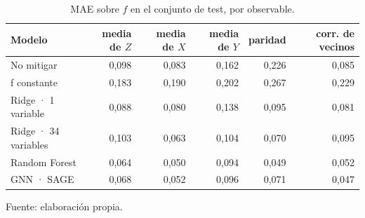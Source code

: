 \begin{table}[htbp]
    \centering
    {\footnotesize
    \begin{tabular}{@{}lrrrrr@{}}
        \toprule
        \textbf{Modelo} & \textbf{media de $Z$} & \textbf{media de $X$} & \textbf{media de $Y$} & \textbf{paridad} & \textbf{corr. de vecinos} \\
        \midrule
        No mitigar & 0,098 & 0,083 & 0,162 & 0,226 & 0,085 \\
        f constante & 0,183 & 0,190 & 0,202 & 0,267 & 0,229 \\
        Ridge · 1 variable & 0,088 & 0,080 & 0,138 & 0,095 & 0,081 \\
        Ridge · 34 variables & 0,103 & 0,063 & 0,104 & 0,070 & 0,095 \\
        Random Forest & 0,064 & 0,050 & 0,094 & 0,049 & 0,052 \\
        GNN · SAGE & 0,068 & 0,052 & 0,096 & 0,071 & 0,047 \\
        \bottomrule
    \end{tabular}}

    \caption{MAE sobre $f$ en el conjunto de test, por observable.}
    \label{tab:comparativa_mae}

    {\footnotesize Fuente: elaboración propia.}
\end{table}
